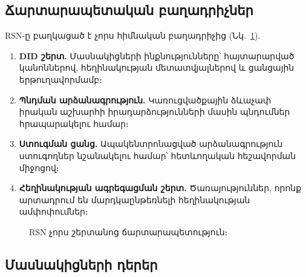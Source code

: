 \documentclass[11pt,a4paper,twocolumn]{article}
\begin{document}
\subsection{Ճարտարապետական բաղադրիչներ}

RSN-ը բաղկացած է չորս հիմնական բաղադրիչից (Նկ.~\ref{fig:architecture}).
\begin{enumerate}[nosep]
\item \textbf{DID շերտ.} Մասնակիցների ինքնությունները՝ հայտարարված կանոններով, հեղինակության մետատվյալներով և ցանցային երթուղավորմամբ։
\item \textbf{Պնդման արձանագրություն.} Կառուցվածքային ձևաչափ իրական աշխարհի իրադարձությունների մասին պնդումներ հրապարակելու համար։
\item \textbf{Ստուգման ցանց.} Ապակենտրոնացված արձանագրություն ստուգողներ նշանակելու համար՝ հետևողական հեշավորման միջոցով։
\item \textbf{Հեղինակության ագրեգացման շերտ.} Ծառայություններ, որոնք արտադրում են մարդկաընթեռնելի հեղինակության ամփոփումներ։
\end{enumerate}

\begin{figure}[ht]
\centering
{}
\caption{RSN չորս շերտանոց ճարտարապետություն։}
\label{fig:architecture}
\end{figure}

\subsection{Մասնակիցների դերեր}
\end{document}
